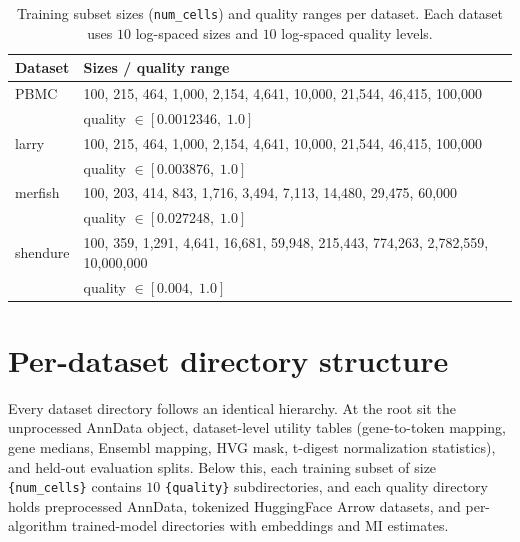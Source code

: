 \documentclass{article}
\begin{document}
\begin{table}[!htbp]
\centering
\caption{Training subset sizes (\texttt{num\_cells}) and quality ranges per dataset. Each dataset uses $10$ log-spaced sizes and $10$ log-spaced quality levels.}
\label{tab:sizes_qualities}
\small
\begin{tabular}{ll}
\toprule
\textbf{Dataset} & \textbf{Sizes / quality range} \\
\midrule
PBMC     & 100, 215, 464, 1{,}000, 2{,}154, 4{,}641, 10{,}000, 21{,}544, 46{,}415, 100{,}000 \\
         & quality $\in [0.0012346,\; 1.0]$ \\
larry    & 100, 215, 464, 1{,}000, 2{,}154, 4{,}641, 10{,}000, 21{,}544, 46{,}415, 100{,}000 \\
         & quality $\in [0.003876,\; 1.0]$ \\
merfish  & 100, 203, 414, 843, 1{,}716, 3{,}494, 7{,}113, 14{,}480, 29{,}475, 60{,}000 \\
         & quality $\in [0.027248,\; 1.0]$ \\
shendure & 100, 359, 1{,}291, 4{,}641, 16{,}681, 59{,}948, 215{,}443, 774{,}263, 2{,}782{,}559, 10{,}000{,}000 \\
         & quality $\in [0.004,\; 1.0]$ \\
\bottomrule
\end{tabular}
\end{table}

\section{Per-dataset directory structure}

Every dataset directory follows an identical hierarchy. At the root sit the unprocessed AnnData object, dataset-level utility tables (gene-to-token mapping, gene medians, Ensembl mapping, HVG mask, t-digest normalization statistics), and held-out evaluation splits. Below this, each training subset of size \texttt{\{num\_cells\}} contains $10$ \texttt{\{quality\}} subdirectories, and each quality directory holds preprocessed AnnData, tokenized HuggingFace Arrow datasets, and per-algorithm trained-model directories with embeddings and MI estimates.
\end{document}
